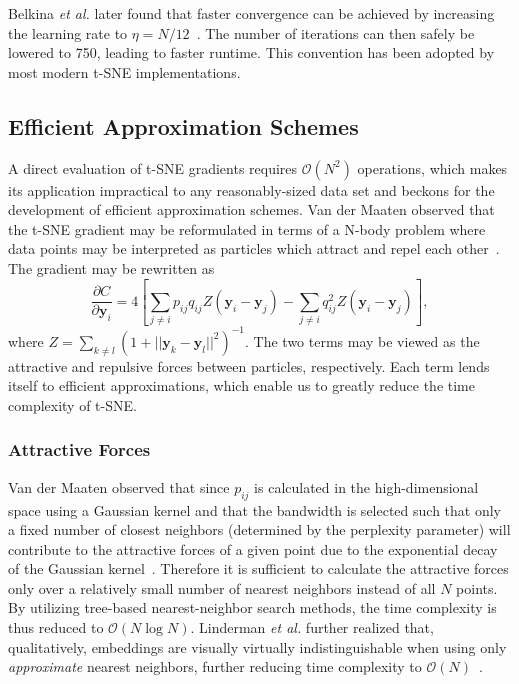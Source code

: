 \documentclass[twocolumn]{bmcart}
\begin{document}
Belkina \textit{et al.} later found that faster convergence can be achieved by
increasing the learning rate to $\eta=N/12$~\cite{belkina2019automated}. The
number of iterations can then safely be lowered to 750, leading to faster
runtime. This convention has been adopted by most modern t-SNE implementations.

\subsection*{Efficient Approximation Schemes} A direct evaluation of t-SNE
gradients requires $\mathcal{O}(N^2)$ operations, which makes its application
impractical to any reasonably-sized data set and beckons for the development of
efficient approximation schemes. Van der Maaten observed that the t-SNE
gradient may be reformulated in terms of a N-body problem where data points may
be interpreted as particles which attract and repel each
other~\cite{van2014accelerating}. The gradient may be rewritten as
\begin{equation}
\frac{\partial C}{\partial \mathbf{y}_i} = 4 \left [ \sum_{j \neq i} p_{ij} q_{ij} Z \left ( \mathbf{y}_i - \mathbf{y}_j \right ) -\sum_{j \neq i} q_{ij}^2 Z \left ( \mathbf{y}_i - \mathbf{y}_j \right ) \right ], \label{eq:grad_attr_rep}
\end{equation}
where $Z = \sum_{k \neq l}\left ( 1 + || \mathbf{y}_k - \mathbf{y}_l ||^2
\right )^{-1}$. The two terms may be viewed as the attractive and repulsive
forces between particles, respectively. Each term lends itself to efficient
approximations, which enable us to greatly reduce the time complexity of t-SNE.

\subsubsection*{Attractive Forces}

Van der Maaten observed that since $p_{ij}$ is calculated in the
high-dimensional space using a Gaussian kernel and that the bandwidth is
selected such that only a fixed number of closest neighbors (determined by the
perplexity parameter) will contribute to the attractive forces of a given point
due to the exponential decay of the Gaussian kernel~\cite{van2014accelerating}.
Therefore it is sufficient to calculate the attractive forces only over a
relatively small number of nearest neighbors instead of all $N$ points. By
utilizing tree-based nearest-neighbor search methods, the time complexity is
thus reduced to $\mathcal{O}(N \log N)$. Linderman \textit{et al.} further
realized that, qualitatively, embeddings are visually virtually
indistinguishable when using only \textit{approximate} nearest neighbors,
further reducing time complexity to $\mathcal{O}(N)$~\cite{linderman2019fast}.
\end{document}

